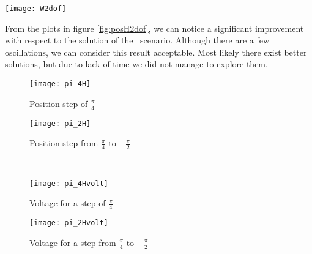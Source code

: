 \begin{figure*}[h]
	\centering
	\texttt{[image: W2dof]}
	\caption{Weighting functions}
\end{figure*}

From the plots in figure \ref{fig:posH2dof}, we can notice a significant improvement with respect to the solution of the \onedof\ scenario. Although there are a few oscillations, we can consider this result acceptable. Most likely there exist better solutions, but due to lack of time we did not manage to explore them.

 \begin{figure*}[h]
	\centering
	\begin{subfigure}{0.5\columnwidth}
		\texttt{[image: pi\_4H]}
		\caption{Position step of $\frac{\pi}{4}$}
	\end{subfigure}
	\begin{subfigure}{0.45\columnwidth}
		\texttt{[image: pi\_2H]}
		\caption{Position step from $\frac{\pi}{4}$ to $-\frac{\pi}{2}$}
	\end{subfigure}
	\\
	\begin{subfigure}{0.5\columnwidth}
		\texttt{[image: pi\_4Hvolt]}
		\caption{Voltage for a step of $\frac{\pi}{4}$}
	\end{subfigure}
	\begin{subfigure}{0.45\columnwidth}
		\texttt{[image: pi\_2Hvolt]}
		\caption{Voltage for a step from $\frac{\pi}{4}$ to $-\frac{\pi}{2}$}
	\end{subfigure}
	\caption{Position steps response}
	\label{fig:posH2dof}
\end{figure*}




 


